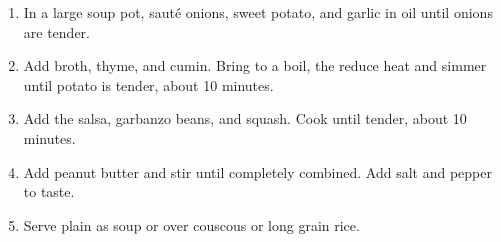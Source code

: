 
\begin{ingredients}
\end{ingredients}


\begin{recipe}
  \begin{enumerate}

  \item In a large soup pot, saut\'e onions, sweet potato, and garlic
    in oil until onions are tender.

  \item Add broth, thyme, and cumin.  Bring to a boil, the reduce heat
    and simmer until potato is tender, about 10 minutes.

  \item Add the salsa, garbanzo beans, and squash.  Cook until tender,
    about 10 minutes.

  \item Add peanut butter and stir until completely combined.  Add
    salt and pepper to taste.

  \item Serve plain as soup or over couscous or long grain rice.

  \end{enumerate}
\end{recipe}
